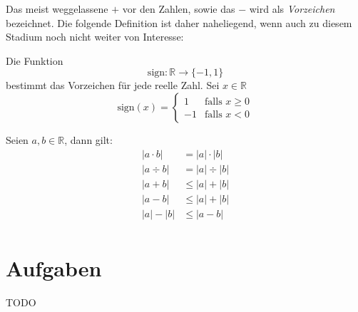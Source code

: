 Das meist weggelassene $+$ vor den Zahlen, sowie das $-$ wird als \textsl{Vorzeichen} bezeichnet. Die folgende Definition ist daher naheliegend, wenn auch zu diesem Stadium noch nicht weiter von Interesse:

\begin{definition}
Die Funktion 
\[
\text{sign} : \mathbb{R} \longrightarrow \lbrace -1,1\rbrace
\]
bestimmt das Vorzeichen für jede reelle Zahl. Sei $x \in \mathbb{R}$
\begin{equation}
\text{sign}(x) = \begin{cases}
1 & \text{falls } x\ge 0 \\
-1 & \text{falls } x < 0
\end{cases}
\end{equation}
\end{definition}
Seien $a,b\in \mathbb{R}$, dann gilt:
\begin{equation}
\begin{split}
|a\cdot b| &= |a|\cdot |b| \\
|a\div b| &= |a|\div |b| \\
|a+b| &\le |a|+|b| \\
|a-b| &\le |a|+|b| \\
|a|-|b| &\le |a-b| \\
\end{split}
\end{equation}


\section{Aufgaben}
TODO
